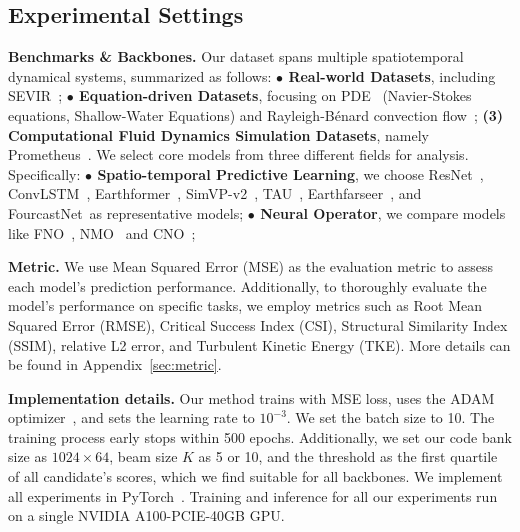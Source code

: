 \subsection{Experimental Settings}
\textbf{Benchmarks \& Backbones.} Our dataset spans multiple spatiotemporal dynamical systems, summarized as follows: \textbf{$\bullet$ Real-world Datasets}, including SEVIR~\cite{veillette2020sevir}; \textbf{$\bullet$ Equation-driven Datasets}, focusing on PDE~\cite{takamoto2022pdebench} (Navier-Stokes equations, Shallow-Water Equations) and Rayleigh-Bénard convection flow~\cite{wang2020towards}; \textbf{(3) Computational Fluid Dynamics Simulation Datasets}, namely Prometheus~\cite{wu2024prometheus}.  We select core models from three different fields for analysis. Specifically: \textbf{$\bullet$ Spatio-temporal Predictive Learning}, we choose ResNet~\cite{he2016deep}, ConvLSTM~\cite{shi2015convolutional}, Earthformer~\cite{gao2022earthformer}, SimVP-v2~\cite{tan2022simvp}, TAU~\cite{tan2023temporal},  Earthfarseer~\cite{wu2024earthfarsser}, and FourcastNet~\cite{pathak2022fourcastnet}as representative models; \textbf{$\bullet$ Neural Operator}, we compare models like FNO~\cite{li2020fourier}, NMO~\cite{wu2024neural} and CNO~\cite{raonic2024convolutional};

\textbf{Metric.} We use Mean Squared Error (MSE) as the evaluation metric to assess each model's prediction performance. Additionally, to thoroughly evaluate the model's performance on specific tasks, we employ metrics such as Root Mean Squared Error (RMSE), Critical Success Index (CSI), Structural Similarity Index (SSIM), relative L2 error, and Turbulent Kinetic Energy (TKE). More details can be found in Appendix~\ref{sec:metric}.

\textbf{Implementation details.} Our method trains with MSE loss, uses the ADAM optimizer~\cite{kingma2014adam}, and sets the learning rate to $10^{-3}$. We set the batch size to 10. The training process early stops within 500 epochs. 
Additionally, we set our code bank size as $1024\times 64$, beam size $K$ as 5 or 10, and the threshold as the first quartile of all candidate's scores, which we find suitable for all backbones. We implement all experiments in PyTorch~\cite{paszke2019pytorch}. Training and inference for all our experiments run on a single NVIDIA A100-PCIE-40GB GPU.

